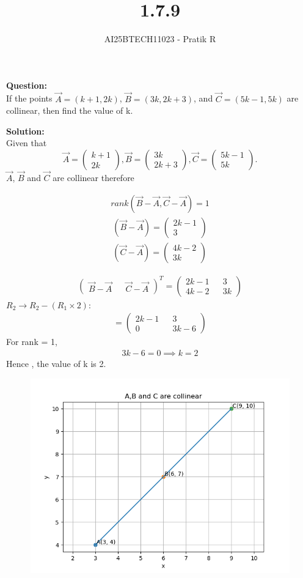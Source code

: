 \documentclass{beamer}
\title{1.7.9}
\author{AI25BTECH11023 - Pratik R}
\providecommand{\brak}[1]{\ensuremath{\left(#1\right)}}
\theoremstyle{remark}
\newcommand{\myvec}[1]{\ensuremath{\begin{pmatrix}#1\end{pmatrix}}}
\numberwithin{equation}{section}
\begin{document}
\maketitle
\begin{frame}
\textbf{Question: }\\
If the points $\vec A= (k + 1,2k)$, $\vec B= (3k,2k + 3)$, and $\vec C= (5k-1,5k)$ are collinear, then
find the value of k.

\textbf{Solution: } \\
Given that
$$
\vec A = \myvec {k+1 \\ 2k}, \vec B = \myvec{3k \\ 2k+3}, \vec C = \myvec{5k-1 \\ 5k}.
$$
$\vec A$, $\vec B$ and $\vec C$ are collinear therefore

\begin{align}
    rank \brak{\vec B- \vec A, \vec C -\vec A}=1 
\end{align}
\begin{align}
    (\vec B-\vec A) = \myvec{2k-1 \\ 3}\\ (\vec C-\vec A) = \myvec{4k-2 \\ 3k}
\end{align}
\end{frame}
 \begin{align}
     \myvec {\vec B -\vec A && \vec C -\vec A}^T =\myvec{2k-1 && 3 \\ 4k-2&& 3k}  
 \end{align}
$R_2 \to R_2 - (R_1\times 2):$
 \begin{align}
 = \myvec{2k-1 && 3 \\ 0 && 3k-6}
 \end{align}
For rank = 1,
\begin{align}
    3k -6 = 0 \implies k = 2
\end{align}
Hence , the value of k is 2.
\begin{frame}
\begin{figure}[h!]
	\centering
	\includegraphics[width=0.7\columnwidth]{../figs/fig.png}
	\caption*{}
	\label{fig}
\end{figure}
\end{frame}
\end{document}
